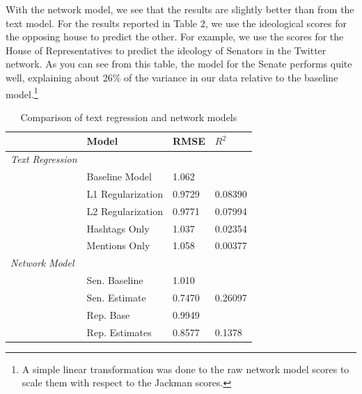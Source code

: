 \documentclass[10pt]{article}
\begin{document}
With the network model, we see that the results are slightly better than from the text model.  For the results reported in Table 2, we use the ideological scores for the opposing house to predict the other.  For example, we use the scores for the House of Representatives to predict the ideology of Senators in the Twitter network.  As you can see from this table, the model for the Senate performs quite well, explaining about 26\% of the variance in our data relative to the baseline model.\footnote{A simple linear transformation was done to the raw network model scores to scale them with respect to the Jackman scores.}

\begin{table}
    \centering
    \caption{Comparison of text regression and network models}
    \begin{tabular}{llll}
        \hline
        & Model & RMSE & $R^{2}$ \\ \hline
        \emph{Text Regression} & & & \\
        & Baseline Model & 1.062 & \\
        & L1 Regularization & 0.9729 & 0.08390 \\
        & L2 Regularization & 0.9771 & 0.07994 \\
        & Hashtags Only & 1.037 & 0.02354 \\
        & Mentions Only & 1.058 & 0.00377 \\ \hline
        \emph{Network Model} & & & \\
        & Sen. Baseline & 1.010 & \\
        & Sen. Estimate & 0.7470 & 0.26097 \\
        & Rep. Base & 0.9949 & \\
        & Rep. Estimates & 0.8577 & 0.1378 \\ \hline
    \end{tabular}
\end{table}
\end{document}
